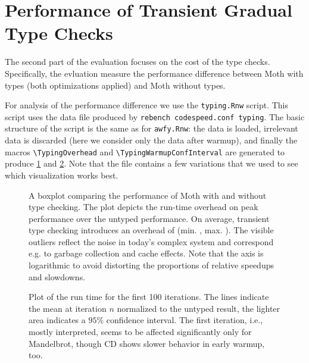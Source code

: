 \documentclass[a4paper,USenglish]{darts-v2019}
\newcommand{\ie}{i.e.\xspace}
\newcommand{\eg}{e.g.\xspace}
\newcommand{\code}[1]{\texttt{#1}}
\begin{document}
\begin{itemize}
\begin{table}[htb]
\begin{tabular}{lr}
\end{tabular}
\label{tab:awfy}
\end{table}

\section{Performance of Transient Gradual Type Checks}

The second part of the evaluation focuses on the cost of the type checks.
Specifically, the evluation measure the performance difference between
Moth with types (both optimizations applied) and Moth without types.

For analysis of the performance difference we use 
the \code{typing.Rnw} script. This script uses the data file
produced by \code{rebench codespeed.conf typing}.
The basic structure of the script is the same as for \code{awfy.Rnw}:
the data is loaded, irrelevant data is discarded
(here we consider only the data after warmup),
and finally the macros \code{\textbackslash{}TypingOverhead}
and \code{\textbackslash{}TypingWarmupConfInterval} are generated
to produce \cref{fig:typing-overhead} and \cref{fig:typing-warmup}.
Note that the file contains a few variations
that we used to see which visualization works best.

\begin{figure}[htb]
  \centering
	\TypingOverhead{}
	\caption{A boxplot comparing the performance of Moth
  with and without type checking.
  The plot depicts the run-time overhead on peak performance over
  the untyped performance. On average, transient type checking introduces
  an overhead of \OverheadTypingGMeanP (min. \OverheadTypingMinP, max. \OverheadTypingMaxP).
  The visible outliers reflect the noise in today's complex system
  and correspond \eg to garbage collection and cache effects.
  Note that the axis is logarithmic to avoid distorting the proportions
  of relative speedups and slowdowns.}
	\label{fig:typing-overhead}
\end{figure}

\begin{figure}[htb]
  \centering
  \TypingWarmupConfInterval{}
	\caption{Plot of the run time for the first 100 iterations.
           The lines indicate the mean at iteration $n$ normalized
           to the untyped result, the lighter area indicates a $95\%$ confidence interval.
           The first iteration, \ie, mostly interpreted, seems
           to be affected significantly only for Mandelbrot, though
           CD shows slower behavior in early warmup, too.}
	\label{fig:typing-warmup}
\end{figure}


\end{itemize}
\end{document}
